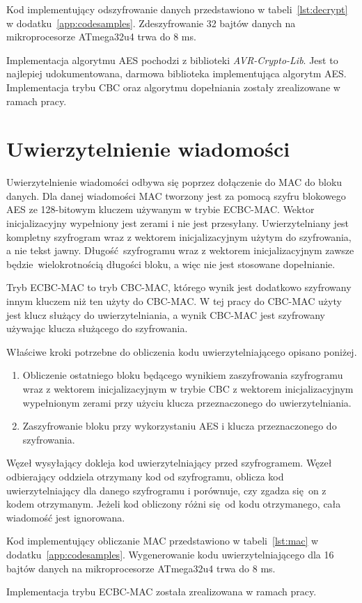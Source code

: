 Kod implementujący odszyfrowanie danych przedstawiono w tabeli~\ref{lst:decrypt} w dodatku~\ref{app:codesamples}. Zdeszyfrowanie 32 bajtów danych na mikroprocesorze ATmega32u4 trwa do 8 ms.

Implementacja algorytmu AES pochodzi z biblioteki \emph{AVR-Crypto-Lib}. Jest to najlepiej udokumentowana, darmowa biblioteka implementująca algorytm AES. Implementacja trybu CBC oraz algorytmu dopełniania zostały zrealizowane w ramach pracy.

\section{Uwierzytelnienie wiadomości}
\label{sec:auth}


Uwierzytelnienie wiadomości odbywa się poprzez dołączenie do MAC do bloku danych. Dla danej wiadomości MAC tworzony jest za pomocą szyfru blokowego AES ze 128-bitowym kluczem używanym w trybie ECBC-MAC. Wektor inicjalizacyjny wypełniony jest zerami i nie jest przesyłany. Uwierzytelniany jest kompletny szyfrogram wraz z wektorem inicjalizacyjnym użytym do szyfrowania, a nie tekst jawny. Długość szyfrogramu wraz z wektorem inicjalizacyjnym zawsze będzie wielokrotnością długości bloku, a więc nie jest stosowane dopełnianie.

Tryb ECBC-MAC to tryb CBC-MAC, którego wynik jest dodatkowo szyfrowany innym kluczem niż ten użyty do CBC-MAC. W tej pracy do CBC-MAC użyty jest klucz służący do uwierzytelniania, a wynik CBC-MAC jest szyfrowany używając klucza służącego do szyfrowania.

Właściwe kroki potrzebne do obliczenia kodu uwierzytelniającego opisano poniżej.

\begin{enumerate}
\item Obliczenie ostatniego bloku będącego wynikiem zaszyfrowania szyfrogramu wraz z wektorem inicjalizacyjnym w trybie CBC z wektorem inicjalizacyjnym wypełnionym zerami przy użyciu klucza przeznaczonego do uwierzytelniania.
\item Zaszyfrowanie bloku przy wykorzystaniu AES i klucza przeznaczonego do szyfrowania.
\end{enumerate}

Węzeł wysyłający dokleja kod uwierzytelniający przed szyfrogramem. Węzeł odbierający oddziela otrzymany kod od szyfrogramu, oblicza kod uwierzytelniający dla danego szyfrogramu i porównuje, czy zgadza się on z kodem otrzymanym. Jeżeli kod obliczony różni się od kodu otrzymanego, cała wiadomość jest ignorowana.

Kod implementujący obliczanie MAC przedstawiono w tabeli~\ref{lst:mac} w dodatku~\ref{app:codesamples}. Wygenerowanie kodu uwierzytelniającego dla 16 bajtów danych na mikroprocesorze ATmega32u4 trwa do 8 ms.

Implementacja trybu ECBC-MAC została zrealizowana w ramach pracy.
